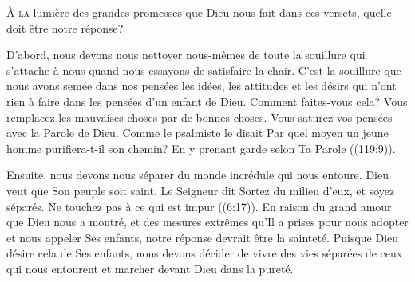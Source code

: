 \dvrule







\lettrine{À}{ la} lumière des grandes promesses que Dieu nous fait
 dans ces versets, quelle doit être notre réponse? 

D'abord, nous devons nous nettoyer nous-mêmes de toute la souillure
 qui s'attache à nous quand nous essayons de satisfaire la chair.
 C'est la souillure que nous avons semée dans nos pensées
 \ocadr les idées, les attitudes et les désirs qui n'ont rien à faire
 dans les pensées d'un enfant de Dieu. Comment faites-vous cela?
 Vous remplacez les mauvaises choses par de bonnes choses.
 Vous saturez vos pensées avec la Parole de Dieu.
 Comme le psalmiste le disait\frcolon{} 
 \Og Par quel moyen un jeune homme purifiera-t-il son chemin?
 En y prenant garde selon Ta Parole \Fg{} ((119:9)).


Ensuite, nous devons nous séparer du monde incrédule qui nous entoure.
 Dieu veut que Son peuple soit saint. Le Seigneur dit\frcolon{} 
 \Og Sortez du milieu d’eux, et soyez séparés.
 Ne touchez pas à ce qui est impur \Fg{} ((6:17)).
 En raison du grand amour que Dieu nous a montré,
 et des mesures extrêmes qu'Il a prises pour nous adopter
 et nous appeler Ses enfants, notre réponse devrait être la sainteté.
 Puisque Dieu désire cela de Ses enfants, nous devons décider de vivre
 des vies séparées de ceux qui nous entourent et marcher devant Dieu dans la pureté.

